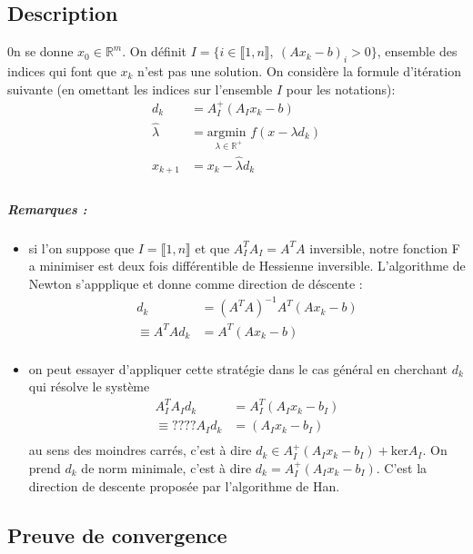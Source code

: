 \documentclass[10pt,a4paper]{article}
\begin{document}
\subsection{Description}
0n se donne $x_0 \in \mathbb{R}^m$.
On définit $I=\lbrace i \in \llbracket 1,n \rrbracket, \ (Ax_k - b)_i > 0 \rbrace$, ensemble des indices qui font que $x_k$ n'est pas une solution.
On considère la formule d'itération suivante (en omettant les indices sur l'ensemble $I$ pour les notations):
\begin{align*}
  d_k & = A_I^+(A_I x_k - b)\\
  \widehat{\lambda} &= \underset{\lambda \in \mathbb{R}^+}{\text{argmin }}f(x - \lambda d_k)\\
  x_{k+1} & =x_k - \widehat{\lambda} d_k \\
\end{align*}
\subparagraph{Remarques :}
\begin{itemize}
  \item si l'on suppose que $I = \llbracket 1,n \rrbracket$ et que $A_I^TA_I = A^TA$ inversible, notre fonction F a minimiser est deux fois différentible de Hessienne inversible.
    L'algorithme de Newton  s'appplique et donne comme direction de déscente :
    \begin{align*}
      d_k &= (A^TA)^{-1}A^T(A x_k - b) \\
      \equiv A^TA d_k &= A^T(A x_k - b) \\
    \end{align*}
  \item on peut essayer d'appliquer cette stratégie dans le cas général en cherchant $d_k$ qui résolve le système
    \begin{align*}
      A_I^TA_I d_k &= A_I^T(A_I x_k - b_I) \\
      \equiv ???? A_I d_k &= (A_I x_k - b_I) \\
    \end{align*}
    au sens des moindres carrés, c'est à dire $d_k \in A_I^+(A_I x_k -b_I) + \text{ker}A_I$.
    On prend $d_k$ de norm minimale, c'est à dire $d_k = A_I^+(A_I x_k -b_I)$.
    C'est la direction de descente proposée par l'algorithme de Han.
\end{itemize}

\subsection{Preuve de convergence}
\end{document}
